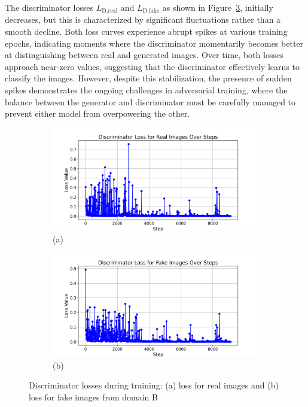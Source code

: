 \documentclass[12pt,DIV14,BCOR12mm,a4paper,footinclude=false,headinclude,parskip=half-,twoside,openright,cleardoublepage=empty,toc=index,bibliography=totoc,listof=totoc]{scrreprt}
\numberwithin{equation}{chapter}
\begin{document}
The discriminator losses $L_{\text{D}, \text{real}}$ and $L_{\text{D}, \text{fake}}$ as shown in Figure~\ref{fig:discriminator_losses}, initially decreases, but this is characterized by significant fluctuations rather than a smooth decline. Both loss curves experience abrupt spikes at various training epochs, indicating moments where the discriminator momentarily becomes better at distinguishing between real and generated images. Over time, both losses approach near-zero values, suggesting that the discriminator effectively learns to classify the images. However, despite this stabilization, the presence of sudden spikes demonstrates the ongoing challenges in adversarial training, where the balance between the generator and discriminator must be carefully managed to prevent either model from overpowering the other.
\begin{figure}
    \centering
    \begin{subfigure}[b]{1.0\textwidth}
        \includegraphics[width=\linewidth]{../media/discriminator_loss_real.png}
        \caption*{(a)}
        \label{fig:dB_loss_real}
    \end{subfigure}

    \begin{subfigure}[b]{1.0\textwidth}
        \includegraphics[width=\linewidth]{../media/discriminator_loss_fake.png}
        \caption*{(b)}
        \label{fig:dB_loss_fake}
    \end{subfigure}

    \caption{Discriminator losses during training: (a) loss for real images and (b) loss for fake images from domain B}
    \label{fig:discriminator_losses}
\end{figure}
\end{document}
